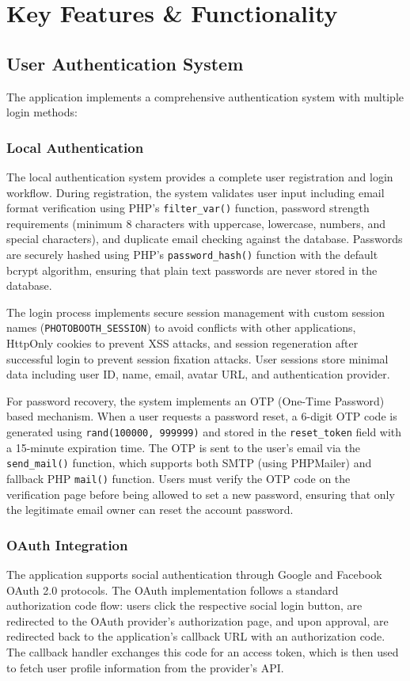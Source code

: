 \documentclass[12pt,a4paper]{article}
\begin{document}
\section{Key Features \& Functionality}

\subsection{User Authentication System}
The application implements a comprehensive authentication system with multiple login methods:

\subsubsection{Local Authentication}
The local authentication system provides a complete user registration and login workflow. During registration, the system validates user input including email format verification using PHP's \texttt{filter\_var()} function, password strength requirements (minimum 8 characters with uppercase, lowercase, numbers, and special characters), and duplicate email checking against the database. Passwords are securely hashed using PHP's \texttt{password\_hash()} function with the default bcrypt algorithm, ensuring that plain text passwords are never stored in the database.

The login process implements secure session management with custom session names (\texttt{PHOTOBOOTH\_SESSION}) to avoid conflicts with other applications, HttpOnly cookies to prevent XSS attacks, and session regeneration after successful login to prevent session fixation attacks. User sessions store minimal data including user ID, name, email, avatar URL, and authentication provider.

For password recovery, the system implements an OTP (One-Time Password) based mechanism. When a user requests a password reset, a 6-digit OTP code is generated using \texttt{rand(100000, 999999)} and stored in the \texttt{reset\_token} field with a 15-minute expiration time. The OTP is sent to the user's email via the \texttt{send\_mail()} function, which supports both SMTP (using PHPMailer) and fallback PHP \texttt{mail()} function. Users must verify the OTP code on the verification page before being allowed to set a new password, ensuring that only the legitimate email owner can reset the account password.

\subsubsection{OAuth Integration}
The application supports social authentication through Google and Facebook OAuth 2.0 protocols. The OAuth implementation follows a standard authorization code flow: users click the respective social login button, are redirected to the OAuth provider's authorization page, and upon approval, are redirected back to the application's callback URL with an authorization code. The callback handler exchanges this code for an access token, which is then used to fetch user profile information from the provider's API.
\end{document}
